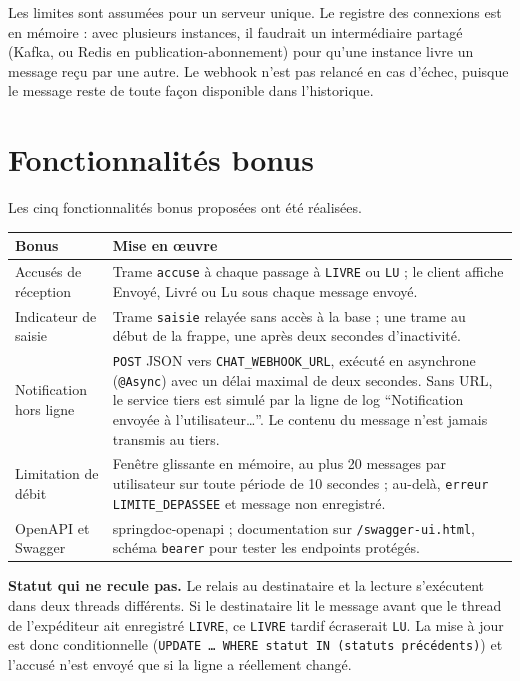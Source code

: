 \documentclass[11pt,a4paper]{article}
\newcommand{\tachesection}[1]{%
\needspace{6\baselineskip}%
\color{tachenavy}%
\section{#1}%
\color{black}%
}
\begin{document}
Les limites sont assumées pour un serveur unique. Le registre des connexions est en mémoire : avec plusieurs instances, il faudrait un intermédiaire partagé (Kafka, ou Redis en publication-abonnement) pour qu'une instance livre un message reçu par une autre. Le webhook n'est pas relancé en cas d'échec, puisque le message reste de toute façon disponible dans l'historique.

\FloatBarrier
\tachesection{Fonctionnalités bonus}
\label{sec:bonus}

Les cinq fonctionnalités bonus proposées ont été réalisées.

{\small\renewcommand{\arraystretch}{1.35}
\begin{longtable}{@{}L{3.2cm}L{12cm}@{}}
\toprule
\textbf{Bonus} & \textbf{Mise en œuvre} \\
\midrule
Accusés de réception & Trame \texttt{accuse} à chaque passage à \texttt{LIVRE} ou \texttt{LU} ; le client affiche Envoyé, Livré ou Lu sous chaque message envoyé. \\
Indicateur de saisie & Trame \texttt{saisie} relayée sans accès à la base ; une trame au début de la frappe, une après deux secondes d'inactivité. \\
Notification hors ligne & \texttt{POST} JSON vers \texttt{CHAT\_WEBHOOK\_URL}, exécuté en asynchrone (\texttt{@Async}) avec un délai maximal de deux secondes. Sans URL, le service tiers est simulé par la ligne de log \enquote{Notification envoyée à l'utilisateur\ldots}. Le contenu du message n'est jamais transmis au tiers. \\
Limitation de débit & Fenêtre glissante en mémoire, au plus 20 messages par utilisateur sur toute période de 10 secondes ; au-delà, \texttt{erreur} \texttt{LIMITE\_DEPASSEE} et message non enregistré. \\
OpenAPI et Swagger & springdoc-openapi ; documentation sur \texttt{/swagger-ui.html}, schéma \texttt{bearer} pour tester les endpoints protégés. \\
\bottomrule
\end{longtable}}

\textbf{Statut qui ne recule pas.} Le relais au destinataire et la lecture s'exécutent dans deux threads différents. Si le destinataire lit le message avant que le thread de l'expéditeur ait enregistré \texttt{LIVRE}, ce \texttt{LIVRE} tardif écraserait \texttt{LU}. La mise à jour est donc conditionnelle (\texttt{UPDATE \ldots{} WHERE statut IN (statuts précédents)}) et l'accusé n'est envoyé que si la ligne a réellement changé.
\end{document}
